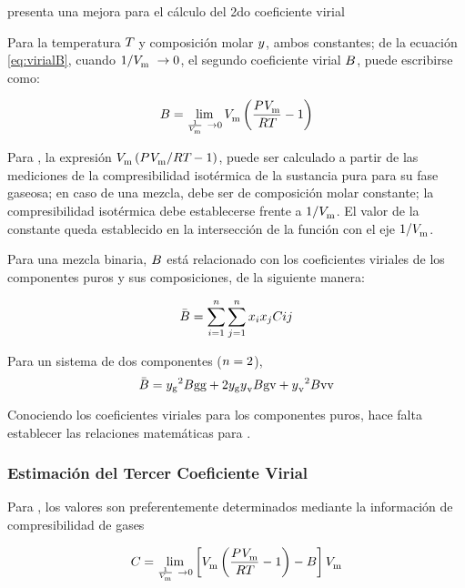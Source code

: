 \parencite{klotz1985improved} presenta una mejora para el cálculo del 2do coeficiente virial



Para la temperatura $T_{}$ y composición molar ${y_{}}$, ambos constantes; de la ecuación \eqref{eq:virialB}, cuando $1 /  {V_{\text{m}}^{}} \ \to 0$,  el segundo coeficiente virial $B_{}{}$, puede escribirse como:

\begin{equation}
  B_{}{} = \lim_{\frac{1}{ {V_{\text{m}}^{}} }\ \to {0}}  {V_{\text{m}}^{}}  \left(\frac{P_{}^{}  {V_{\text{m}}^{}} } {R T_{}} - 1 \right)
\end{equation}

Para \parencite[p. 473]{beattie1942second}, la expresión $ {V_{\text{m}}^{}}  \left({P_{}^{}  {V_{\text{m}}^{}} } / {R T_{}} - 1 \right)$, puede ser calculado a partir de las mediciones de la compresibilidad isotérmica de la sustancia pura para su fase gaseosa; en caso de una mezcla, debe ser de composición molar constante; la compresibilidad isotérmica debe establecerse frente a $1 /  {V_{\text{m}}^{}} $. El valor de la constante queda establecido en la intersección de la función con el eje $1/  {V_{\text{m}}^{}} $.

Para una mezcla binaria, $B_{}{}$ está relacionado con los coeficientes viriales de los componentes puros y sus composiciones, de la siguiente manera:

\begin{equation}
   \bar{B_{}}{} = \sum_{i=1}^{n} \sum_{j=1}^{n} x_i x_j C_{}{ij} {}
\end{equation}

Para un sistema de dos componentes ($n = 2$),
\begin{equation}
   \bar{B_{}}{} = {{y_{{\text{\ensuremath{\text{g}}}}}}}^2 B_{}{{\text{\ensuremath{\text{g}}}} {\text{\ensuremath{\text{g}}}}} + 2 {{y_{{\text{\ensuremath{\text{g}}}}}}} {y_{}}_{{\text{\ensuremath{\text{v}}}}} B_{}{{\text{\ensuremath{\text{g}}}} {\text{\ensuremath{\text{v}}}}} + {{y_{}}_{{\text{\ensuremath{\text{v}}}}}}^2 B_{}{{\text{\ensuremath{\text{v}}}} {\text{\ensuremath{\text{v}}}}}{}
\end{equation}
\namingEqSecondVirialCoeff{}

Conociendo los coeficientes viriales para los componentes puros, hace falta establecer las relaciones matemáticas para {\bCoeffVirial{\nameG \nameV}}.



\subsubsection{Estimación del Tercer Coeficiente Virial}
Para \parencite{Dymond2002}, los valores son preferentemente determinados mediante la información de compresibilidad de gases 

\begin{equation}
  C_{}{} = \lim_{\frac{1}{ {V_{\text{m}}^{}} }\ \to {0}} \left[  {V_{\text{m}}^{}}  \left(\frac{P_{}^{}  {V_{\text{m}}^{}} } {R T_{}} - 1 \right) - B_{}{} \right]  {\ensuremath{V_{\text{m}}^{}}} 
\end{equation}


